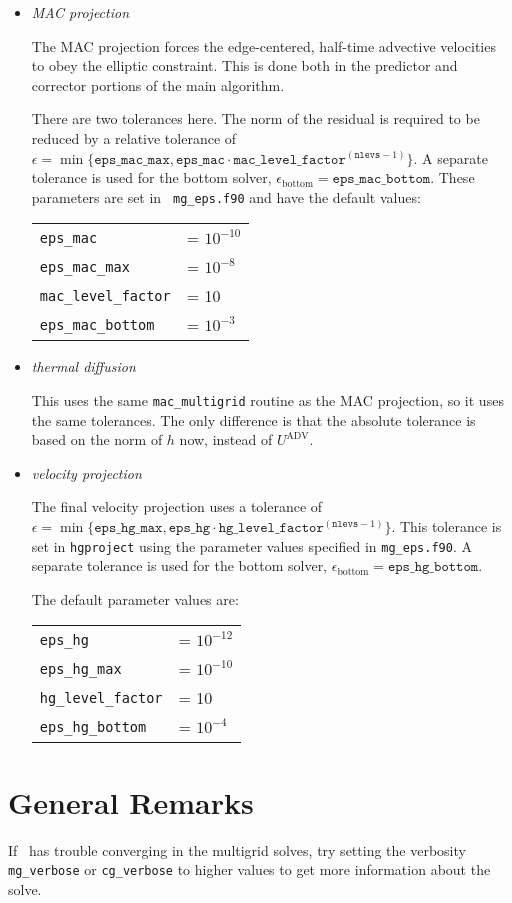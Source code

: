\begin{itemize}

\item {\em MAC projection}  

  The MAC projection forces the edge-centered, half-time advective
  velocities to obey the elliptic constraint.  This is done both in
  the predictor and corrector portions of the main algorithm.

  There are two tolerances here.  The norm of the residual is required
  to be reduced by a relative tolerance of $\epsilon =
  \min \{ \mathtt{eps\_mac\_max}, \mathtt{eps\_mac} \cdot
  \mathtt{mac\_level\_factor}^{(\mathtt{nlevs}-1)} \}$. A separate
  tolerance is used for the bottom
  solver, $\epsilon_\mathrm{bottom} =
  \mathtt{eps\_mac\_bottom}$.  These parameters are set in {\tt
    mg\_eps.f90} and have the default values:
   \begin{center}
   \begin{tabular}{ll}
   {\tt eps\_mac}           &= $10^{-10}$ \\
   {\tt eps\_mac\_max}           &= $10^{-8}$ \\
   {\tt mac\_level\_factor} &= 10 \\
   {\tt eps\_mac\_bottom}   &= $10^{-3}$
   \end{tabular}
   \end{center}



\item {\em thermal diffusion}

  This uses the same {\tt mac\_multigrid} routine as the MAC
  projection, so it uses the same tolerances.  The only difference is
  that the absolute tolerance is based on the norm of $h$ now, instead
  of $U^\mathrm{ADV}$.

\item {\em velocity projection}

  The final velocity projection uses a tolerance of $\epsilon = \min \{
  \mathtt{eps\_hg\_max}, \mathtt{eps\_hg} \cdot \mathtt{hg\_level\_factor}^{(\mathtt{nlevs} - 1)} \}$.  This tolerance
  is set in {\tt hgproject} using the parameter values specified in {\tt mg\_eps.f90}.  A separate
  tolerance is used for the bottom
  solver, $\epsilon_\mathrm{bottom} = \mathtt{eps\_hg\_bottom}$.


  The default parameter values are:
   \begin{center}
   \begin{tabular}{ll}
   {\tt eps\_hg}     &= $10^{-12}$ \\
   {\tt eps\_hg\_max}      &= $10^{-10}$ \\
   {\tt hg\_level\_factor}  &= 10 \\
   {\tt eps\_hg\_bottom}   &= $10^{-4}$
   \end{tabular}
   \end{center}

\end{itemize}


\section{General Remarks}

If \maestro\ has trouble converging in the multigrid solves, try
setting the verbosity {\tt mg\_verbose} or {\tt cg\_verbose} to
higher values to get more information about the solve.
